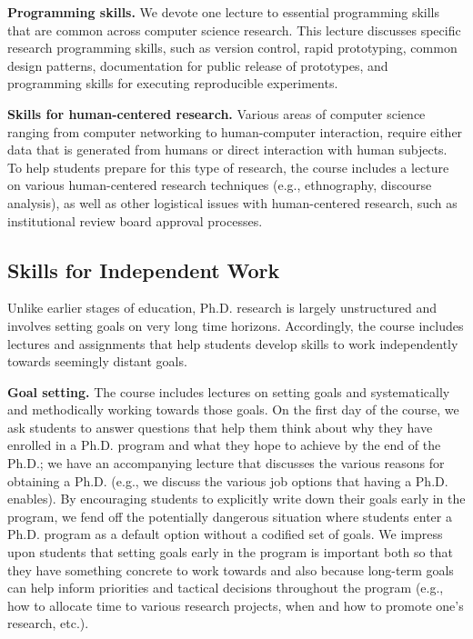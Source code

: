 \vspace*{0.1in}
\noindent
{\bf Programming skills.}  We devote one lecture to essential
programming skills that are common across computer science research.
This lecture discusses specific research programming skills, such as
version control, rapid prototyping, common design patterns,
documentation for public release of prototypes, and programming skills
for executing reproducible experiments.

\vspace*{0.1in}
\noindent
{\bf Skills for human-centered research.}  Various areas of computer
science ranging from computer networking to human-computer interaction,
require either data that is generated from humans or direct interaction
with human subjects.  To help students prepare for this type of
research, the course includes a lecture on various human-centered
research techniques (e.g., ethnography, discourse analysis), as well as
other logistical issues with human-centered research, such as
institutional review board approval processes.  


\subsection{Skills for Independent Work}

Unlike earlier stages of education, Ph.D. research is
largely unstructured and involves setting goals on very long time
horizons.  Accordingly, the course includes lectures and assignments
that help students develop skills to work independently towards
seemingly distant goals.  

\vspace*{0.1in}
\noindent
{\bf Goal setting.}  The course includes lectures on setting goals and
systematically and methodically working towards those goals.  On the
first day of the course, we ask students to answer questions that help
them think about why they have enrolled in a Ph.D. program and what they
hope to achieve by the end of the Ph.D.; we have an accompanying lecture
that discusses the various reasons for obtaining a Ph.D. (e.g., we
discuss the various job options that having a Ph.D. enables).  By
encouraging students to explicitly write down their goals early in the
program, we fend off the potentially dangerous situation where students
enter a Ph.D. program as a default option without a codified set of
goals.  We impress upon students that setting goals early in the program
is important both so that they have something concrete to work towards
and also because long-term goals can help inform priorities and tactical
decisions throughout the program (e.g., how to allocate time to various
research projects, when and how to promote one's research, etc.).

